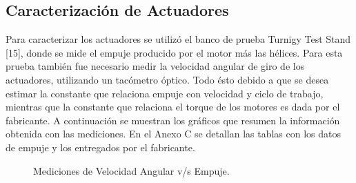 \documentclass[../main.tex]{subfiles}
\begin{document}
\subsection{Caracterización de Actuadores}

Para caracterizar los actuadores se utilizó el banco de prueba Turnigy
Test Stand [15], donde se mide el empuje producido por el motor más las
hélices. Para esta prueba también fue necesario medir la velocidad
angular de giro de los actuadores, utilizando un tacómetro óptico.
Todo ésto debido a que se desea estimar la constante que relaciona
empuje con velocidad y ciclo de trabajo, mientras que la constante
que relaciona el torque de los motores es dada por el fabricante.
A continuación se muestran los gráficos que resumen la información
obtenida con las mediciones. En el Anexo C se detallan
las tablas con los datos de empuje y los entregados por el fabricante.

\textcompwordmark{}

\begin{figure}[H]
\noindent \begin{centering}
\par\end{centering}
\noindent \begin{centering}
\par\end{centering}
\caption{Mediciones de Velocidad Angular v/s Empuje.}
\end{figure}
\end{document}
